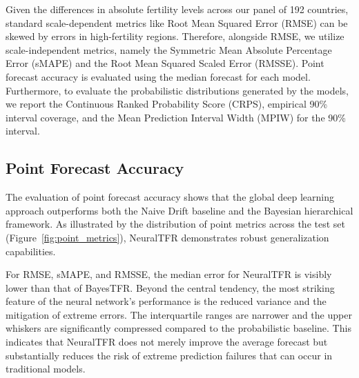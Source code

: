 \documentclass[12pt]{article}
\begin{document}
Given the differences in absolute fertility levels across our panel of 192 countries, standard scale-dependent metrics like Root Mean Squared Error (RMSE) can be skewed by errors in high-fertility regions. Therefore, alongside RMSE, we utilize scale-independent metrics, namely the Symmetric Mean Absolute Percentage Error (sMAPE) and the Root Mean Squared Scaled Error (RMSSE). Point forecast accuracy is evaluated using the median forecast for each model. Furthermore, to evaluate the probabilistic distributions generated by the models, we report the Continuous Ranked Probability Score (CRPS), empirical 90\% interval coverage, and the Mean Prediction Interval Width (MPIW) for the 90\% interval.

\subsection{Point Forecast Accuracy}

The evaluation of point forecast accuracy shows that the global deep learning approach outperforms both the Naive Drift baseline and the Bayesian hierarchical framework. As illustrated by the distribution of point metrics across the test set (Figure~\ref{fig:point_metrics}), NeuralTFR demonstrates robust generalization capabilities. 

For RMSE, sMAPE, and RMSSE, the median error for NeuralTFR is visibly lower than that of BayesTFR. Beyond the central tendency, the most striking feature of the neural network's performance is the reduced variance and the mitigation of extreme errors. The interquartile ranges are narrower and the upper whiskers are significantly compressed compared to the probabilistic baseline. This indicates that NeuralTFR does not merely improve the average forecast but substantially reduces the risk of extreme prediction failures that can occur in traditional models. 
\end{document}
